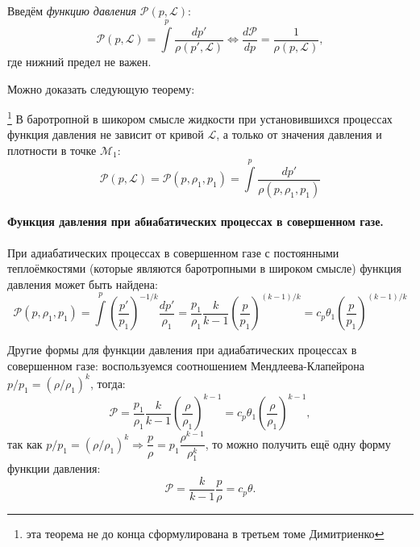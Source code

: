 Введём \emph{функцию давления} $\mathcal{P} (p, \mathcal{L})$:
\[
  \mathcal{P} (p, \mathcal{L}) = \int\limits^p \dfrac{dp'}{\rho(p', \mathcal{L})}
  \Leftrightarrow
  \dfrac{d\mathcal{P}}{dp} = \dfrac{1}{\rho(p, \mathcal{L})},
\]
где нижний предел не важен.

Можно доказать следующую теорему:
\begin{theorem}\footnote{эта теорема не до конца сформулирована в третьем томе Димитриенко}
  В баротропной в шикором смысле жидкости при установившихся процессах
  функция давления не зависит от кривой $\mathcal{L}$, а только от значения давления
  и плотности в точке $\mathcal{M}_1$:
  \[
    \mathcal{P}(p, \mathcal{L}) = \mathcal{P}(p, \rho_1, p_1) = \int\limits^p \dfrac{dp'}{\rho(p, \rho_1, p_1)}
  \]
\end{theorem}

\paragraph{Функция давления при абиабатических процессах в совершенном газе.}
При адиабатических процессах в совершенном газе с постоянными теплоёмкостями (которые
являются баротропными в широком смысле) функция давления может быть найдена:
\[
  \mathcal{P}(p, \rho_1, p_1) = \int\limits^p \left( \dfrac{p'}{p_1} \right)^{- 1/k} \dfrac{dp'}{\rho_1} = \dfrac{p_1}{\rho_1} \dfrac{k}{k-1} \left( \dfrac{p}{p_1} \right)^{(k-1)/k} =
  c_p \theta_1 \left( \dfrac{p}{p_1} \right)^{(k-1)/k}
\]

Другие формы для функции давления при адиабатических процессах в совершенном газе:
воспользуемся соотношением Мендлеева-Клапейрона $p / p_1 = \left( \rho / \rho_1 \right)^k $,
тогда:
\[
  \mathcal{P} = \dfrac{p_1}{\rho_1} \dfrac{k}{k-1} \left( \dfrac{\rho}{\rho_1} \right)^{k-1} =
  c_p \theta_1 \left( \dfrac{\rho}{\rho_1} \right)^{k-1},
\]
так как $p / p_1 = \left( \rho / \rho_1 \right)^k \Rightarrow \dfrac{p}{\rho} = p_1 \dfrac{\rho^{k-1}}{\rho_1^k}$, то можно получить ещё одну форму функции давления:
\[
  \mathcal{P} = \dfrac{k}{k-1} \dfrac{p}{\rho} = c_p \theta.
\]
